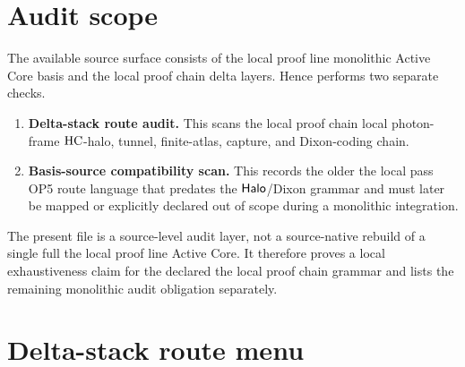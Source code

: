 \begin{abstract}
This layer audits the available route-menu surface after the local proof chain. Its
purpose is not to introduce a new algebraic mechanism. It checks whether the
local photon-frame \(\HC\)-halo/Dixon coding chain leaves any declared
admissible near-kernel \(\OPfive\) route outside the finite capture menu
\(A_1,\ldots,A_6\). The result is deliberately scoped: the local proof chain delta
stack is internally exhausted by the local proof chain classification, while the
available monolithic basis source is only the local proof line. Therefore this layer
certifies the declared delta-stack route image and records the exact remaining
condition for a future source-native monolithic freeze: no active OP5 branch in
the full Active Core may remain outside the capture classes or the named
zero-register tests.
\end{abstract}

\section{Audit scope}

The available source surface consists of the local proof line monolithic Active Core
basis and the local proof chain delta layers. Hence performs two separate checks.

\begin{enumerate}
\item \textbf{Delta-stack route audit.} This scans the local proof chain local
photon-frame \(\HC\)-halo, tunnel, finite-atlas, capture, and Dixon-coding
chain.
\item \textbf{Basis-source compatibility scan.} This records the older the local pass
OP5 route language that predates the \(\mathsf{Halo}\)/Dixon grammar and must later be
mapped or explicitly declared out of scope during a monolithic integration.
\end{enumerate}

\begin{remark}
The present file is a source-level audit layer, not a source-native rebuild of a
single full the local proof line Active Core. It therefore proves a local exhaustiveness
claim for the declared the local proof chain grammar and lists the remaining monolithic audit
obligation separately.
\end{remark}

\section{Delta-stack route menu}

